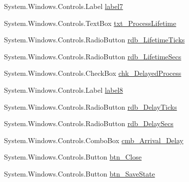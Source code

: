 \begin{DoxyCompactItemize}
\item 
System.\+Windows.\+Controls.\+Label \hyperlink{class_c_p_u___o_s___simulator_1_1_operating_system_main_window_ae841fdcc76cc96944b0463f3c4c448a4}{label7}
\item 
System.\+Windows.\+Controls.\+Text\+Box \hyperlink{class_c_p_u___o_s___simulator_1_1_operating_system_main_window_acc33a47fbe7956196846504306f7489e}{txt\+\_\+\+Process\+Lifetime}
\item 
System.\+Windows.\+Controls.\+Radio\+Button \hyperlink{class_c_p_u___o_s___simulator_1_1_operating_system_main_window_ae338ba4b15d62c6d584aaa5814fa8506}{rdb\+\_\+\+Lifetime\+Ticks}
\item 
System.\+Windows.\+Controls.\+Radio\+Button \hyperlink{class_c_p_u___o_s___simulator_1_1_operating_system_main_window_a09745c9a76909a398d8a47295fda2b67}{rdb\+\_\+\+Lifetime\+Secs}
\item 
System.\+Windows.\+Controls.\+Check\+Box \hyperlink{class_c_p_u___o_s___simulator_1_1_operating_system_main_window_aa7e58acf30f50880e309615f92f0ef8e}{chk\+\_\+\+Delayed\+Process}
\item 
System.\+Windows.\+Controls.\+Label \hyperlink{class_c_p_u___o_s___simulator_1_1_operating_system_main_window_af57c4cce87917105945b6c5d1f6b812e}{label8}
\item 
System.\+Windows.\+Controls.\+Radio\+Button \hyperlink{class_c_p_u___o_s___simulator_1_1_operating_system_main_window_a7b70deef80df6719fc0b7b9c87c268d7}{rdb\+\_\+\+Delay\+Ticks}
\item 
System.\+Windows.\+Controls.\+Radio\+Button \hyperlink{class_c_p_u___o_s___simulator_1_1_operating_system_main_window_a7b4585b869d26fa4e7d419a064f4f73c}{rdb\+\_\+\+Delay\+Secs}
\item 
System.\+Windows.\+Controls.\+Combo\+Box \hyperlink{class_c_p_u___o_s___simulator_1_1_operating_system_main_window_ad4e310b5bbd70de23e9132fb57229c96}{cmb\+\_\+\+Arrival\+\_\+\+Delay}
\item 
System.\+Windows.\+Controls.\+Button \hyperlink{class_c_p_u___o_s___simulator_1_1_operating_system_main_window_ad0ca6083cb0afc42ce05182655540a45}{btn\+\_\+\+Close}
\item 
System.\+Windows.\+Controls.\+Button \hyperlink{class_c_p_u___o_s___simulator_1_1_operating_system_main_window_a9320f9ba12e9a1e460840eca6bda4e17}{btn\+\_\+\+Save\+State}
\end{DoxyCompactItemize}
